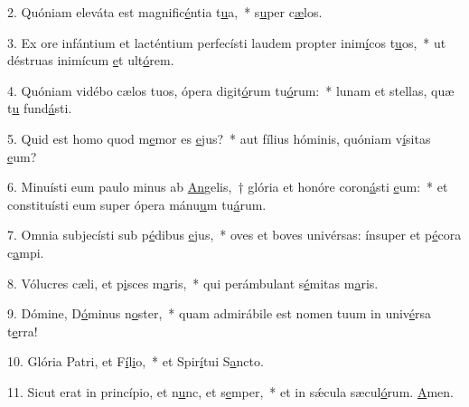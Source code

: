 2. Quóniam eleváta est magnific\uline{é}ntia t\uline{u}a,~* s\uline{u}per c\uline{æ}los.\par 
3. Ex ore infántium et lacténtium perfecísti laudem propter inim\uline{í}cos t\uline{u}os,~* ut déstruas inimícum \uline{e}t ult\uline{ó}rem.\par 
4. Quóniam vidébo cælos tuos, ópera digit\uline{ó}rum tu\uline{ó}rum:~* lunam et stellas, quæ t\uline{u} fund\uline{á}sti.\par 
5. Quid est homo quod m\uline{e}mor es \uline{e}jus?~* aut fílius hóminis, quóniam v\uline{í}sitas \uline{e}um?\par 
6. Minuísti eum paulo minus ab \uline{An}gelis,~† glória et honóre coron\uline{á}sti \uline{e}um:~* et constituísti eum super ópera mánu\uline{u}m tu\uline{á}rum.\par 
7. Omnia subjecísti sub p\uline{é}dibus \uline{e}jus,~* oves et boves univérsas: ínsuper et p\uline{é}cora c\uline{a}mpi.\par 
8. Vólucres cæli, et p\uline{i}sces m\uline{a}ris,~* qui perámbulant s\uline{é}mitas m\uline{a}ris.\par 
9. Dómine, D\uline{ó}minus n\uline{o}ster,~* quam admirábile est nomen tuum in univ\uline{é}rsa t\uline{e}rra!\par 
10. Glória Patri, et F\uline{í}l\uline{i}o,~* et Spir\uline{í}tui S\uline{a}ncto.\par 
11. Sicut erat in princípio, et n\uline{u}nc, et s\uline{e}mper,~* et in sǽcula sæcul\uline{ó}rum. \uline{A}men.\par 
